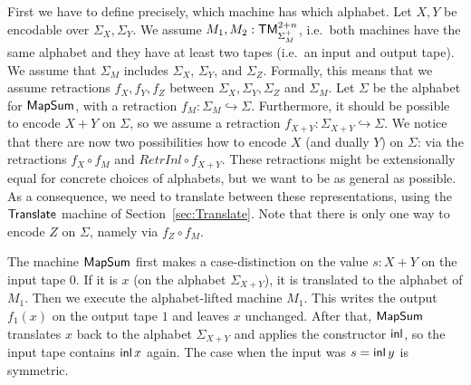 First we have to define precisely, which machine has which alphabet.  Let $X, Y$ be encodable over $\Sigma_X, \Sigma_Y$.  We assume
$M_1, M_2 : \mathsf{TM}_{\Sigma_M^+}^{2+n}$, i.e.\ both machines have the same alphabet and they have at least two tapes (i.e.\ an input and output tape).  We
assume that $\Sigma_M$ includes $\Sigma_X$, $\Sigma_Y$, and $\Sigma_Z$.  Formally, this means that we assume retractions $f_X,f_Y,f_Z$ between
$\Sigma_X, \Sigma_Y, \Sigma_Z$ and $\Sigma_M$.  Let $\Sigma$ be the alphabet for $\mathsf{MapSum}$, with a retraction
$f_M : \Sigma_M \hookrightarrow \Sigma$.  Furthermore, it should be possible to encode $X+Y$ on $\Sigma$, so we assume a retraction
$f_{X+Y} : \Sigma_{X+Y} \hookrightarrow \Sigma$.  We notice that there are now two possibilities how to encode $X$ (and dually $Y$) on $\Sigma$: via
the retractions $f_X \circ f_M$ and $RetrInl \circ f_{X+Y}$.  These retractions might be extensionally equal for concrete choices of alphabets, but we
want to be as general as possible.  As a consequence, we need to translate between these representations, using the $\mathsf{Translate}$ machine of
Section~\ref{sec:Translate}.  Note that there is only one way to encode $Z$ on $\Sigma$, namely via $f_Z \circ f_M$.

The machine $\mathsf{MapSum}$ first makes a case-distinction on the value $s:X+Y$ on the input tape $0$.  If it is $x$ (on the alphabet $\Sigma_{X+Y}$),
it is translated to the alphabet of $M_1$.  Then we execute the alphabet-lifted machine $M_1$.  This writes the output $f_1(x)$ on the output tape $1$
and leaves $x$ unchanged.  After that, $\mathsf{MapSum}$ translates $x$ back to the alphabet $\Sigma_{X+Y}$ and applies the constructor $\operatorname{\mathsf{inl}}$, so the
input tape contains $\operatorname{\mathsf{inl}} x$ again.  The case when the input was $s=\operatorname{\mathsf{inl}} y$ is symmetric.

